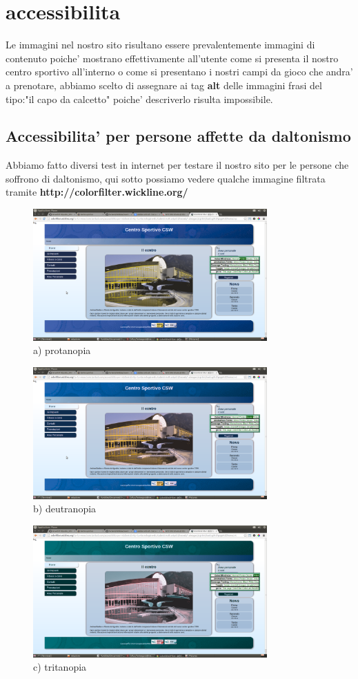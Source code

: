\section{accessibilita}
Le immagini nel nostro sito risultano essere prevalentemente immagini di contenuto poiche' mostrano effettivamente all'utente come si presenta il nostro centro sportivo all'interno o come si presentano i nostri campi da gioco che andra' a prenotare, abbiamo scelto di assegnare ai tag \textbf{alt} delle immagini frasi del tipo:"il capo da calcetto" poiche' descriverlo risulta impossibile.
\subsection{Accessibilita' per persone affette da daltonismo}
Abbiamo fatto diversi test in internet per testare il nostro sito per le persone che soffrono di daltonismo, qui sotto possiamo vedere qualche immagine filtrata tramite \textbf{http://colorfilter.wickline.org/}
\begin{figure}[H]
	\includegraphics[width=0.8\textwidth]{images/protan.png} 
	\caption{a) protanopia}
\end{figure}
\begin{figure}[H]
	\includegraphics[width=0.8\textwidth]{images/deutran.png} 
	\caption{b) deutranopia} 
\end{figure}
\begin{figure}[H]
	\includegraphics[width=0.8\textwidth]{images/tritan.png} 
	\caption{c) tritanopia}
\end{figure}
